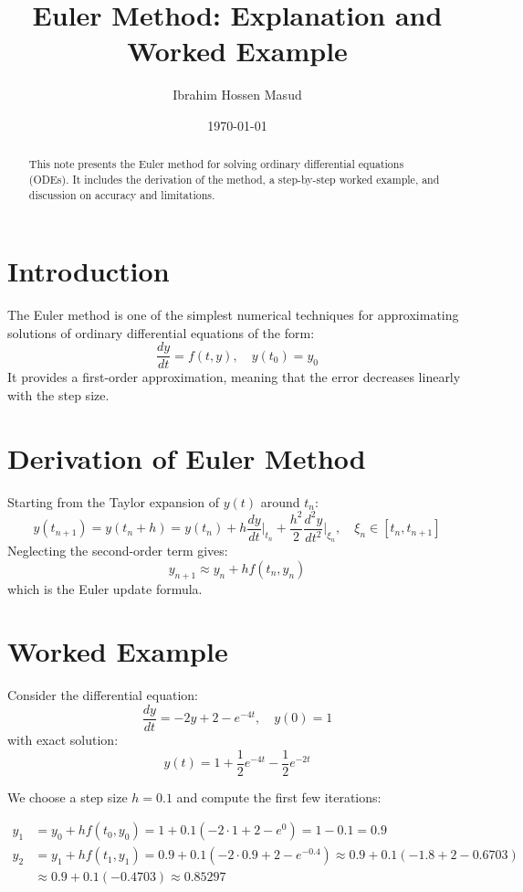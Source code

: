 \documentclass[11pt,a4paper]{article}
\title{Euler Method: Explanation and Worked Example}
\author{Ibrahim Hossen Masud}
\date{\today}
\begin{document}
\maketitle

\begin{abstract}
This note presents the Euler method for solving ordinary differential equations (ODEs). 
It includes the derivation of the method, a step-by-step worked example, and discussion on accuracy and limitations.
\end{abstract}

\section{Introduction}
The Euler method is one of the simplest numerical techniques for approximating solutions of ordinary differential equations of the form:
\[
\frac{dy}{dt} = f(t,y), \quad y(t_0) = y_0
\]
It provides a first-order approximation, meaning that the error decreases linearly with the step size.

\section{Derivation of Euler Method}
Starting from the Taylor expansion of $y(t)$ around $t_n$:
\[
y(t_{n+1}) = y(t_n + h) = y(t_n) + h \frac{dy}{dt}\bigg|_{t_n} + \frac{h^2}{2} \frac{d^2y}{dt^2}\bigg|_{\xi_n}, \quad \xi_n \in [t_n, t_{n+1}]
\]
Neglecting the second-order term gives:
\[
y_{n+1} \approx y_n + h f(t_n, y_n)
\]
which is the Euler update formula.

\section{Worked Example}
Consider the differential equation:
\[
\frac{dy}{dt} = -2y + 2 - e^{-4t}, \quad y(0) = 1
\]
with exact solution:
\[
y(t) = 1 + \frac{1}{2} e^{-4t} - \frac{1}{2} e^{-2t}
\]

We choose a step size \(h = 0.1\) and compute the first few iterations:

\[
\begin{aligned}
y_1 &= y_0 + h f(t_0, y_0) = 1 + 0.1(-2\cdot 1 + 2 - e^{0}) = 1 - 0.1 = 0.9 \\
y_2 &= y_1 + h f(t_1, y_1) = 0.9 + 0.1(-2\cdot 0.9 + 2 - e^{-0.4}) \approx 0.9 + 0.1(-1.8 + 2 - 0.6703) \\
&\approx 0.9 + 0.1(-0.4703) \approx 0.85297
\end{aligned}
\]
\end{document}
